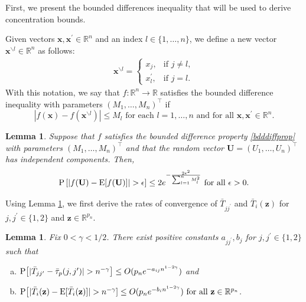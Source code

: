 \documentclass[twoside]{article}
\newcommand{\bU}{\mathbf{U}}
\newcommand{\bx}{\mathbf{x}}
\newcommand{\bz}{\mathbf{z}}
\newcommand{\0}{\mathbf{0}}
\newcommand{\1}{\mathbf{1}}
\numberwithin{equation}{section}
\newtheorem{lemma}[thm]{Lemma}
\begin{document}
First, we present the bounded differences inequality that will be used to derive concentration bounds.

Given vectors $\bx,\bx^\prime\in\mathbb{R}^n$ and an index $l\in\{1,\ldots,n\}$, we define a new vector $\bx^{\backslash l}\in\mathbb{R}^n$ as follows:
\begin{align}\label{bdddiffprop}
 \bx^{\backslash l}=\begin{cases}
x_j,& \text{if } j\neq l,\\
x^{\prime}_l, &           \text{if } j= l.
\end{cases}
\end{align}
With this notation, we say that $f:\mathbb{R}^n\to\mathbb{R}$ satisfies the bounded difference inequality with parameters $(M_1,\ldots, M_n)^\top$ if
$$|f(\bx)-f(\bx^{\backslash l})|\leq M_l\text{ for each }l=1,\ldots,n\text{ and for all }\bx,\bx^\prime\in\mathbb{R}^n.$$

\begin{lemma}\label{bdddiffineq}
\citep[page 37]{wainwright2019high} Suppose that $f$ satisfies the bounded difference property \eqref{bdddiffprop} with parameters $(M_1,\ldots, M_n)^\top$ and that the random vector $\bU = (U_1,\ldots, U_n)^\top$ has independent components. Then,
$${\rm P}\left[\left|f(\bU)-{\rm E}[f(\bU)]\right|>\epsilon\right ]\leq 2e^{-\frac{2\epsilon^2}{\sum_{l=1}^nM_l^2}}\text{ for all }\epsilon>0.$$
\end{lemma}

Using Lemma \ref{bdddiffineq}, we first derive the rates of convergence of $\bar{T}_{jj^\prime}$ and $\bar{T}_i(\bz)$ for $j,j^\prime\in\{1,2\}$ and $ \bz\in\mathbb{R}^{p_n}$.

\begin{lemma}\label{supplemm2}
Fix $0<\gamma<1/2$. There exist positive constants $a_{jj^\prime},b_{j}$ for $j,j^\prime\in\{1,2\}$ such that
\begin{enumerate}[(a)]
 \item ${\rm P}\big [|\bar{T}_{jj^\prime}-\bar{\tau}_p(j,j^\prime)|>n^{-\gamma} \big]\leq O(p_n e^{-a_{ij} n^{1-2\gamma}})$ and
 \item ${\rm P}\big [|\bar{T}_{i}(\bz)-{\rm E}[\bar{T}_{i}(\bz)]|>n^{-\gamma}]\leq O(p_n e^{-b_{i} n^{1-2\gamma}})\text{ for all }\bz\in\mathbb{R}^{p_n}$.
\end{enumerate}
\end{lemma}
\end{document}
